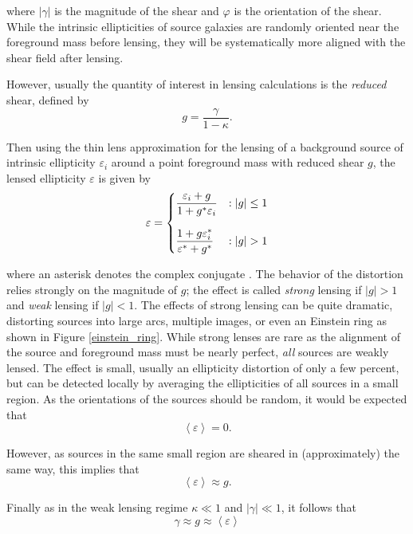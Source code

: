 \documentclass[%
 reprint,
 amsmath,amssymb,
 aps,nofootinbib
]{revtex4-1}
\begin{document}
\noindent where $|\gamma|$ is the magnitude of the shear and $\varphi$ is the orientation of the shear. While the intrinsic ellipticities of source galaxies are randomly oriented near the foreground mass before lensing, they will be systematically more aligned with the shear field after lensing.%

However, usually the quantity of interest in lensing calculations is the \textit{reduced} shear, defined by
\begin{equation}\label{reduced_shear}
g=\frac{\gamma}{1-\kappa}.
\end{equation}

\noindent Then using the thin lens approximation for the lensing of a background source of intrinsic ellipticity $\varepsilon_i$ around a point foreground mass with reduced shear $g$, the lensed ellipticity $\varepsilon$ is given by
\begin{equation}\label{lensing}
 \varepsilon = \begin{dcases} 
      \frac{\varepsilon_i+g}{1+g^*\varepsilon_i} & : |g|\leq1 \\[0.75em]
       \frac{1+g\varepsilon_i^*}{\varepsilon^*+g^*} & : |g|>1
   \end{dcases}
\end{equation}

\noindent where an asterisk denotes the complex conjugate \cite{schneider}. The behavior of the distortion relies strongly on the magnitude of $g$; the
effect is called \textit{strong} lensing if $|g|>1$ and \textit{weak} lensing if $|g|<1$. The effects of strong lensing can be quite dramatic, distorting sources into large arcs, multiple images, or even an Einstein ring as shown in Figure \ref{einstein_ring}. While strong lenses are rare as the alignment of the source and foreground mass must be nearly perfect, \textit{all} sources are weakly lensed. The effect is small, usually an ellipticity distortion of only a few percent, but can be detected locally by averaging the ellipticities of all sources in a small region. As the orientations of the sources should be random, it would be expected that
$$\left<\varepsilon\right>=0.$$

\noindent However, as sources in the same small region are sheared in (approximately) the same way, this implies that
\begin{equation}
\left<\varepsilon\right>\approx g.
\end{equation}

 \noindent Finally as in the weak lensing regime ${\kappa\ll1}$ and ${|\gamma|\ll1}$, it follows that
 \begin{equation}
 \gamma\approx g\approx\left<\varepsilon\right>
 \end{equation}
\end{document}
